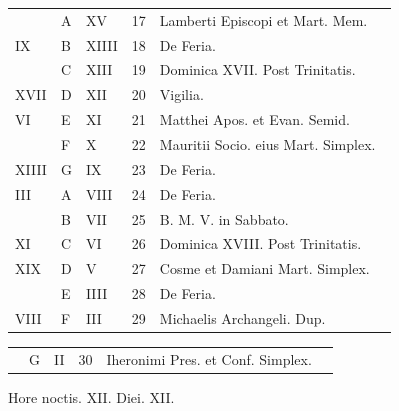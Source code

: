 \begin{center}
\begin{tabular}{l | l | l | r | l l}
\color{Red}  & \color{Red} A & \color{Red} XV & 17 & Lamberti Episcopi et Mart. Mem. \\
\color{Red} IX & B & \color{Red} XIIII & 18 & De Feria. \\%
\color{Red}  & C & \color{Red} XIII & 19 & Dominica XVII. Post Trinitatis. & \color{Red} \\
\color{Red} XVII & D & \color{Red} XII & 20 & \color{Red} \qquad \color{Red} Vigilia. \\
\color{Red} VI & E & \color{Red} XI & 21 & \multicolumn{2}{l}{Matthei Apos. et Evan. Semid.} \color{Red} \\
\color{Red}  & F & \color{Red} X & 22 & \multicolumn{2}{l}{Mauritii Socio. eius Mart. Simplex.} \color{Red} \\
\color{Red} XIIII & G & \color{Red} IX & 23 & De Feria. & \color{Red} \\
\color{Red} III & \color{Red} A & \color{Red} VIII & 24 & De Feria. & \color{Red} \\
\color{Red}  & B & \color{Red} VII & 25 & B. M. V. in Sabbato. & \color{Red} \\
\color{Red} XI & C & \color{Red} VI & 26 & Dominica XVIII. Post Trinitatis. & \color{Red} \\
\color{Red} XIX & D & \color{Red} V & 27 & \color{Red} Cosme et Damiani Mart. Simplex. \\
\color{Red}  & E & \color{Red} IIII & 28 & De Feria. & \color{Red} \\
\color{Red} VIII & F & \color{Red} III & 29 & \color{Red} Michaelis Archangeli. Dup. & \color{Red} \\
\end{tabular}
\end{center}

\begin{center}
\begin{tabular}{l | l | l | r | l l}
\color{Red}  & G & \color{Red} II & 30 & Iheronimi Pres. et Conf. Simplex. \\
\end{tabular}
\newline \color{Red} Hore noctis. XII. Diei. XII.
\end{center}



\color{Red}\color{black}


